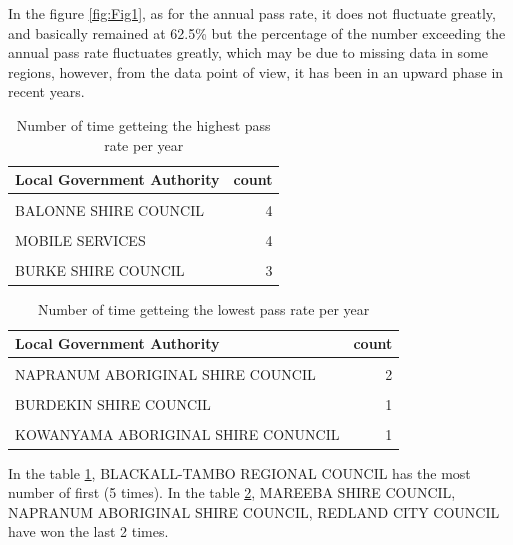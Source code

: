 \documentclass[11pt,a4paper,]{article}
\begin{document}
In the figure \ref{fig:Fig1}, as for the annual pass rate, it does not fluctuate greatly, and basically remained at 62.5\% but the percentage of the number exceeding the annual pass rate fluctuates greatly, which may be due to missing data in some regions, however, from the data point of view, it has been in an upward phase in recent years.

\begin{table}[!h]

\caption{\label{tab:Tab1}Number of time getteing the highest pass rate per year}
\centering
\begin{tabular}[t]{lr}
\toprule
Local Government Authority & count\\
\midrule
\cellcolor{gray!6}{BLACKALL-TAMBO REGIONAL COUNCIL} & \cellcolor{gray!6}{5}\\
BALONNE SHIRE COUNCIL & 4\\
\cellcolor{gray!6}{HOPE VALE ABORIGINAL SHIRE COUNCIL} & \cellcolor{gray!6}{4}\\
MOBILE SERVICES & 4\\
\cellcolor{gray!6}{BARCALDINE REGIONAL COUNCIL} & \cellcolor{gray!6}{3}\\
\addlinespace
BURKE SHIRE COUNCIL & 3\\
\bottomrule
\end{tabular}
\end{table}

\begin{table}[!h]

\caption{\label{tab:Tab2}Number of time getteing the lowest pass rate per year}
\centering
\begin{tabular}[t]{lr}
\toprule
Local Government Authority & count\\
\midrule
\cellcolor{gray!6}{MAREEBA SHIRE COUNCIL} & \cellcolor{gray!6}{2}\\
NAPRANUM ABORIGINAL SHIRE COUNCIL & 2\\
\cellcolor{gray!6}{REDLAND CITY COUNCIL} & \cellcolor{gray!6}{2}\\
BURDEKIN SHIRE COUNCIL & 1\\
\cellcolor{gray!6}{HOPE VALE ABORIGINAL SHIRE COUNCIL} & \cellcolor{gray!6}{1}\\
\addlinespace
KOWANYAMA ABORIGINAL SHIRE CONUNCIL & 1\\
\bottomrule
\end{tabular}
\end{table}

In the table \ref{tab:Tab1}, BLACKALL-TAMBO REGIONAL COUNCIL has the most number of first (5 times). In the table \ref{tab:Tab2}, MAREEBA SHIRE COUNCIL, NAPRANUM ABORIGINAL SHIRE COUNCIL, REDLAND CITY COUNCIL have won the last 2 times.
\end{document}
